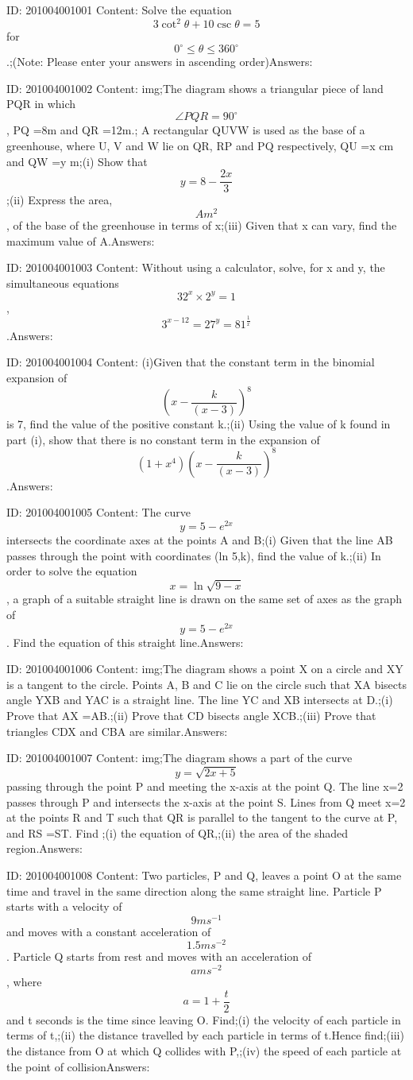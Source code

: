\documentclass{article}
\begin{document}
ID: 201004001001
Content:
Solve the equation $$3\cot^2 \theta + 10 \csc \theta =5$$ for $$0^{\circ} \leq \theta \leq 360^{\circ}$$.;(Note: Please enter your answers in ascending order)Answers:

ID: 201004001002
Content:
img;The diagram shows a triangular piece of land PQR in which $$\angle PQR =90^{\circ}$$, PQ =8m and QR =12m.; A rectangular QUVW is used as the base of a greenhouse, where U, V and W lie on QR, RP and PQ respectively, QU =x cm and QW =y m;(i) Show that $$y =8-\frac{2x}{3}$$;(ii) Express the area, $$A m^2$$, of the base of the greenhouse in terms of x;(iii) Given that x can vary, find the maximum value of A.Answers:

ID: 201004001003
Content:
Without using a calculator, solve, for x and y, the simultaneous equations $$32^x \times 2^y = 1$$,$$3^{x-12} = 27^y = 81^{\frac{1}{x}}$$.Answers:

ID: 201004001004
Content:
(i)Given that the constant term in the binomial expansion of $$(x-\frac{k}{(x-3)})^8$$ is 7, find the value of the positive constant k.;(ii) Using the value of k found in part (i), show that there is no constant term in the expansion of $$(1+x^4)(x-\frac{k}{(x-3)})^8$$.Answers:

ID: 201004001005
Content:
The curve $$y=5-e^{2x}$$ intersects the coordinate axes at the points A and B;(i) Given that the line AB passes through the point with coordinates (ln 5,k), find the value of k.;(ii) In order to solve the equation $$x=\ln \sqrt{9-x}$$, a graph of a suitable straight line is drawn on the same set of axes as the graph of $$y =5-e^{2x}$$. Find the equation of this straight line.Answers:

ID: 201004001006
Content:
img;The diagram shows a point X on a circle and XY is a tangent to the circle. Points A, B and C lie on the circle such that XA bisects angle YXB and YAC is a straight line. The line YC and XB intersects at D.;(i) Prove that AX =AB.;(ii) Prove that CD bisects angle XCB.;(iii) Prove that triangles CDX and CBA are similar.Answers:

ID: 201004001007
Content:
img;The diagram shows a part of the curve $$y =\sqrt{2x+5}$$ passing through the point P and meeting the x-axis at the point Q. The line x=2 passes through P and intersects the x-axis at the point S. Lines from Q meet x=2 at the points R and T such that QR is parallel to the tangent to the curve at P, and RS =ST. Find ;(i) the equation of QR,;(ii) the area of the shaded region.Answers:

ID: 201004001008
Content:
Two particles, P and Q, leaves a point O at the same time and travel in the same direction along the same straight line. Particle P starts with a velocity of $$9 ms^{-1}$$ and moves with a constant acceleration of $$1.5 ms^{-2}$$. Particle Q starts from rest and moves with an acceleration of $$a ms^{-2}$$, where $$a=1+\frac{t}{2}$$ and t seconds is the time since leaving O. Find;(i) the velocity of each particle in terms of t,;(ii) the distance travelled by each particle in terms of t.Hence find;(iii) the distance from O at which Q collides with P,;(iv) the speed of each particle at the point of collisionAnswers:
\end{document}
